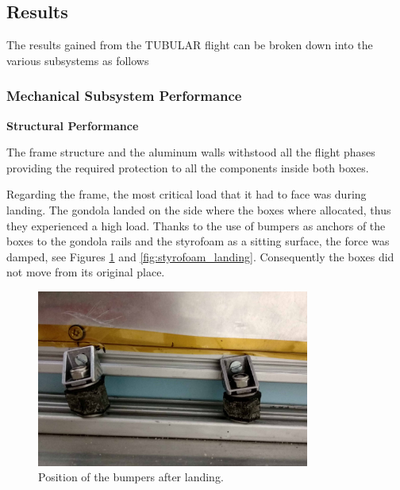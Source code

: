 \subsection{Results}

The results gained from the TUBULAR flight can be broken down into the various subsystems as follows

\subsubsection{Mechanical Subsystem Performance}

\textbf{Structural Performance}

\smallskip
The frame structure and the aluminum walls withstood all the flight phases providing the required protection to all the components inside both boxes. 

Regarding the frame, the most critical load that it had to face was during landing. The gondola landed on the side where the boxes where allocated, thus they experienced a high load. Thanks to the use of bumpers as anchors of the boxes to the gondola rails and the styrofoam as a sitting surface, the force was damped, see Figures \ref{fig:bumpers_landing} and \ref{fig:styrofoam_landing}. Consequently the boxes did not move from its original place.

\begin{figure}[H]
    \centering
    \includegraphics[width=0.8\textwidth]{7-data-analysis-and-results/img/Bumpers_Post_Flight.jpg}
    \caption{Position of the bumpers after landing.}
    \label{fig:bumpers_landing}
\end{figure}

